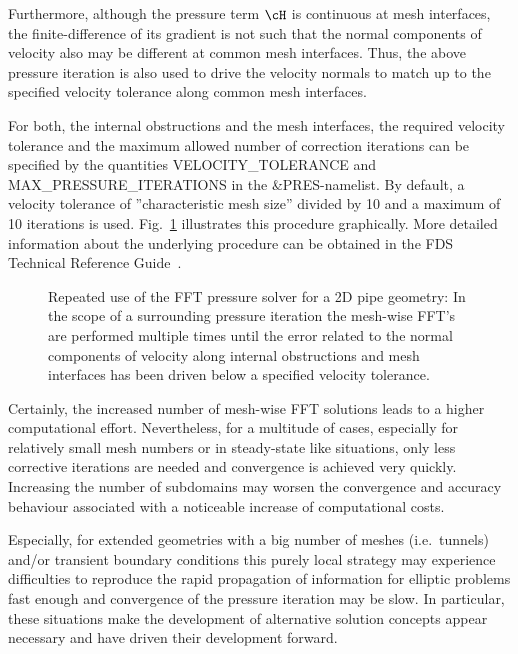 Furthermore, although the pressure term $\cH$ is continuous at mesh interfaces, the finite-difference of its gradient is not such that the normal components of velocity also may be different at common mesh interfaces. Thus, the above pressure iteration is also used to drive the velocity normals to match up to the specified velocity tolerance along common mesh interfaces.

For both, the internal obstructions and the mesh interfaces, the required velocity tolerance and the maximum allowed number of correction iterations can be specified by the quantities {\ct VELOCITY\_TOLERANCE} and {\ct  MAX\_PRESSURE\_ITERATIONS} 
in the {\ct \&PRES}-namelist. By default, a velocity tolerance of ''characteristic mesh size'' divided by 10 and a maximum of 10 iterations is used. Fig.~\ref{FIG_SCARC_multi_pipe_fft_presite} illustrates this procedure graphically.
More detailed information about the underlying procedure can be obtained in the FDS Technical Reference Guide~\cite{McGrattan:2018:TG}.

\begin{figure}[ht]
\begin{center}

\caption[Mesh-wise FFT-methods with pressure correction]{Repeated use of the FFT pressure solver for a 2D pipe geometry: In the scope of a surrounding pressure iteration the mesh-wise FFT's are performed multiple times until the error related to the normal components of velocity along internal obstructions and mesh interfaces has been driven below a specified velocity tolerance.}
\label{FIG_SCARC_multi_pipe_fft_presite}
\end{center}
\end{figure}

Certainly, the increased number of mesh-wise FFT solutions leads to a higher computational effort. Nevertheless, for a multitude of cases, especially for relatively small mesh numbers or in steady-state like situations, only less corrective iterations are needed and convergence is achieved very quickly.
Increasing the number of subdomains may worsen the convergence and accuracy behaviour associated with a noticeable increase of computational costs.

Especially, for extended geometries with a big number of meshes (i.e.\ tunnels) and/or transient boundary conditions this purely local strategy may experience difficulties to reproduce the rapid propagation of information for elliptic problems fast enough and convergence of the pressure iteration may be slow.
In particular, these situations make the development of alternative solution concepts appear necessary and have driven their development forward.


